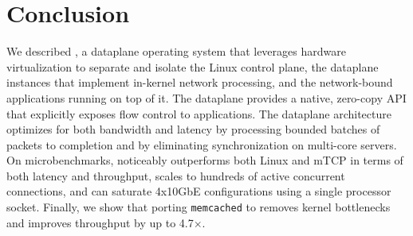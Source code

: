 
\section{Conclusion}

We described \ix, a dataplane operating system that leverages hardware
virtualization to separate and isolate the Linux control plane, the
\ix dataplane instances that implement in-kernel network processing,
and the network-bound applications running on top of it.  The \ix
dataplane provides a native, zero-copy API that explicitly exposes
flow control to applications. The dataplane architecture optimizes for
both bandwidth and latency by processing bounded batches of packets to
completion and by eliminating synchronization on multi-core
servers. On microbenchmarks, \ix noticeably outperforms both Linux and
mTCP in terms of both latency and throughput, scales to hundreds of
active concurrent connections, and can saturate 4x10GbE configurations
using a single processor socket.  Finally, we show that porting
\texttt{memcached} to \ix removes kernel bottlenecks and improves
throughput by up to 4.7$\times$.


